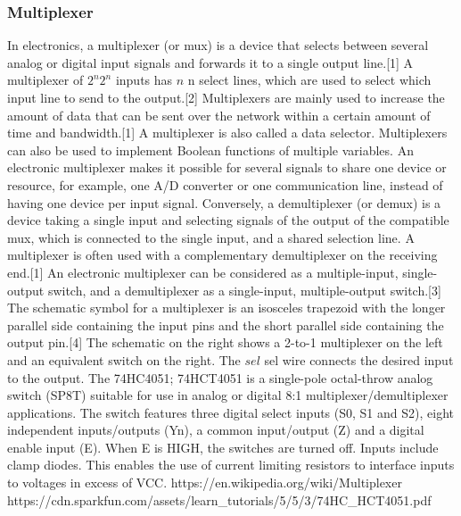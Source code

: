 \subsubsection{Multiplexer}
In electronics, a multiplexer (or mux) is a device that selects between several analog 
or digital input signals and forwards it to a single output line.[1] A multiplexer of 
${\displaystyle 2^{n}} 2^{n}$ inputs has ${\displaystyle n}$ n select lines, which are 
used to select which input line to send to the output.[2] Multiplexers are mainly used 
to increase the amount of data that can be sent over the network within a certain amount 
of time and bandwidth.[1] A multiplexer is also called a data selector. Multiplexers can 
also be used to implement Boolean functions of multiple variables.
An electronic multiplexer makes it possible for several signals to share one device or 
resource, for example, one A/D converter or one communication line, instead of having one 
device per input signal.
Conversely, a demultiplexer (or demux) is a device taking a single input and selecting 
signals of the output of the compatible mux, which is connected to the single input, and 
a shared selection line. A multiplexer is often used with a complementary demultiplexer 
on the receiving end.[1]
An electronic multiplexer can be considered as a multiple-input, single-output switch, 
and a demultiplexer as a single-input, multiple-output switch.[3] The schematic symbol 
for a multiplexer is an isosceles trapezoid with the longer parallel side containing the 
input pins and the short parallel side containing the output pin.[4] The schematic on the 
right shows a 2-to-1 multiplexer on the left and an equivalent switch on the right. 
The ${\displaystyle sel}$ sel wire connects the desired input to the output.
The 74HC4051; 74HCT4051 is a single-pole octal-throw analog switch (SP8T) suitable for 
use in analog or digital 8:1 multiplexer/demultiplexer applications. The switch features 
three digital select inputs (S0, S1 and S2), eight independent inputs/outputs (Yn), a 
common input/output (Z) and a digital enable input (E). When E is HIGH, the switches are 
turned off. Inputs include clamp diodes. This enables the use of current limiting resistors 
to interface inputs to voltages in excess of VCC.
https://en.wikipedia.org/wiki/Multiplexer
https://cdn.sparkfun.com/assets/learn_tutorials/5/5/3/74HC_HCT4051.pdf


